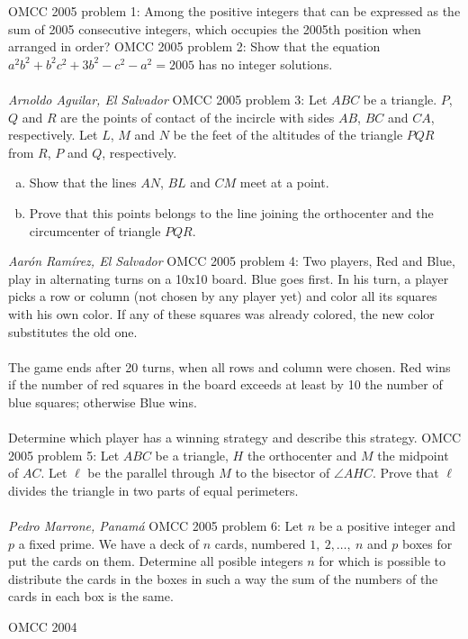 OMCC 2005 problem 1: Among the positive integers that can be expressed as the sum of 2005 consecutive integers, which occupies the 2005th position when arranged in order?
OMCC 2005 problem 2:  Show that the equation $a^2b^2+b^2c^2+3b^2-c^2-a^2=2005$ has no integer solutions. \\\\
\textit{Arnoldo Aguilar, El Salvador} 
OMCC 2005 problem 3:  Let $ABC$ be a triangle. $P$, $Q$ and $R$ are the points of contact of the incircle with sides $AB$, $BC$ and $CA$, respectively. Let $L$, $M$ and $N$ be the feet of the altitudes of the triangle $PQR$ from $R$, $P$ and $Q$, respectively.
\begin{enumerate}[a)]
  \item Show that the lines $AN$, $BL$ and $CM$ meet at a point.
  \item Prove that this points belongs to the line joining the orthocenter and the circumcenter of triangle $PQR$.
\end{enumerate}
\textit{Aarón Ramírez, El Salvador} 
OMCC 2005 problem 4:  Two players, Red and Blue, play in alternating turns on a 10x10 board. Blue goes first. In his turn, a player picks a row or column (not chosen by any player yet) and color all its squares with his own color. If any of these squares was already colored, the new color substitutes the old one. \\\\
The game ends after 20 turns, when all rows and column were chosen. Red wins if the number of red squares in the board exceeds at least by 10 the number of blue squares; otherwise Blue wins. \\\\
Determine which player has a winning strategy and describe this strategy. 
OMCC 2005 problem 5:  Let $ABC$ be a triangle, $H$ the orthocenter and $M$ the midpoint of $AC$. Let $\ell$ be the parallel through $M$ to the bisector of $\angle AHC$. Prove that $\ell$ divides the triangle in two parts of equal perimeters. \\\\
\textit{Pedro Marrone, Panamá} 
OMCC 2005 problem 6:  Let $n$ be a positive integer and $p$ a fixed prime. We have a deck of $n$ cards, numbered $1,\ 2,\ldots,\ n$ and $p$ boxes for put the cards on them. Determine all posible integers $n$ for which is possible to distribute the cards in the boxes in such a way the sum of the numbers of the cards in each box is the same. 


OMCC 2004 

